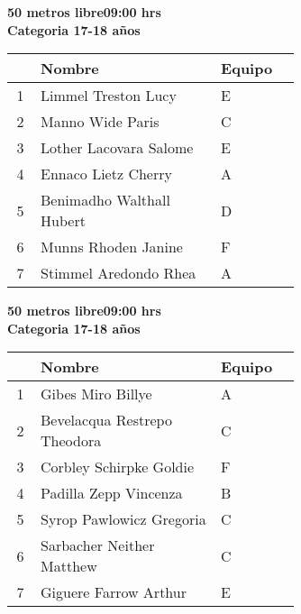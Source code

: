 \begin{minipage}{0.95\linewidth}\vspace{0.5cm} 
\begin{flushleft}
\textbf{
\hspace{-0.15cm}50 metros libre\hspace{1.5cm}09:00 hrs \\Categoria 17-18 años}\vspace{-0.2cm} 
\end{flushleft}
\begin{tabular}{cp{0.63\linewidth}l}
\hline
& \textbf{Nombre} & \textbf{Equipo} \\ \hline
1 & Limmel Treston Lucy & E \\ 
2 & Manno Wide Paris & C \\ 
3 & Lother Lacovara Salome & E \\ 
4 & Ennaco Lietz Cherry & A \\ 
5 & Benimadho Walthall Hubert & D \\ 
6 & Munns Rhoden Janine & F \\ 
7 & Stimmel Aredondo Rhea & A \\ 
\end{tabular}
\end{minipage}
\begin{minipage}{0.95\linewidth}\vspace{0.5cm} 
\begin{flushleft}
\textbf{
\hspace{-0.15cm}50 metros libre\hspace{1.5cm}09:00 hrs \\Categoria 17-18 años}\vspace{-0.2cm} 
\end{flushleft}
\begin{tabular}{cp{0.63\linewidth}l}
\hline
& \textbf{Nombre} & \textbf{Equipo} \\ \hline
1 & Gibes Miro Billye & A \\ 
2 & Bevelacqua Restrepo Theodora & C \\ 
3 & Corbley Schirpke Goldie & F \\ 
4 & Padilla Zepp Vincenza & B \\ 
5 & Syrop Pawlowicz Gregoria & C \\ 
6 & Sarbacher Neither Matthew & C \\ 
7 & Giguere Farrow Arthur & E \\ 
\end{tabular}
\end{minipage}
